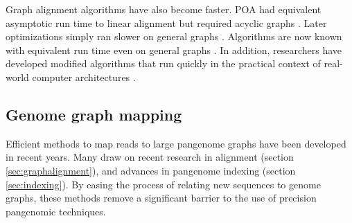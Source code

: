 Graph alignment algorithms have also become faster.
\textsc{POA} had equivalent asymptotic run time to linear alignment but required acyclic graphs \cite{Lee_2002}. 
Later optimizations simply ran slower on general graphs \cite{Kavya_2019}.
Algorithms are now known with equivalent run time even on general graphs \cite{Jain_2019a}.
In addition, researchers have developed modified algorithms that run quickly in the practical context of real-world computer architectures \cite{Suzuki_2018, Rautiainen_2019, Jain_2019b}.


\subsection{Genome graph mapping}
Efficient methods to map reads to large pangenome graphs have been developed in recent years. %
Many draw on recent research in alignment (section \ref{sec:graphalignment}), and advances in pangenome indexing (section \ref{sec:indexing}).
By easing the process of relating new sequences to genome graphs, these methods remove a significant barrier to the use of precision pangenomic techniques.





